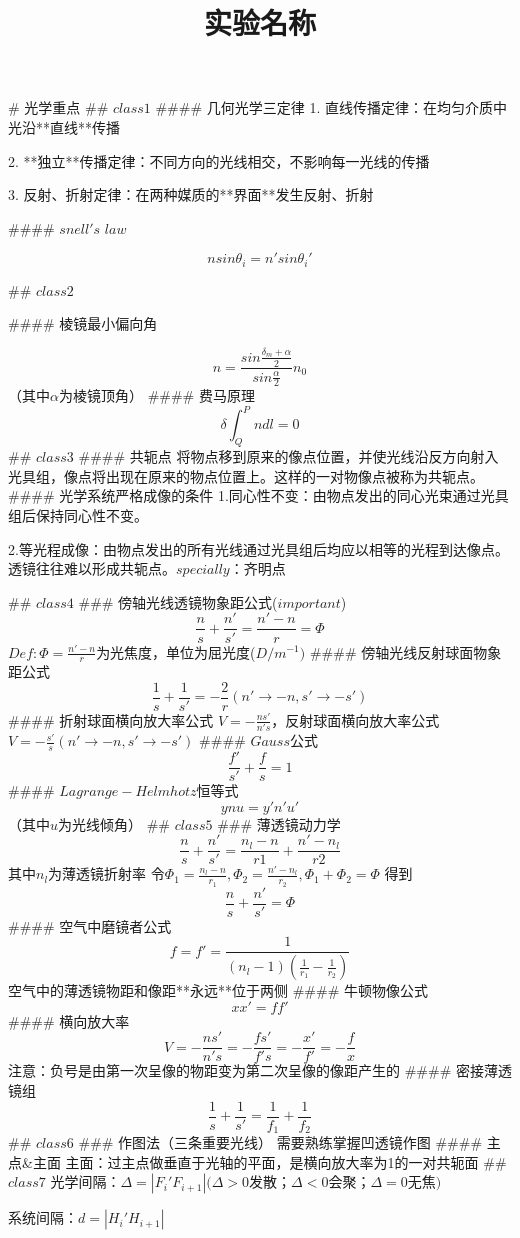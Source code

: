 \documentclass[12pt]{ctexart}
\title{实验名称}
\begin{document}
# 光学重点
## $class1$
#### 几何光学三定律
1. 直线传播定律：在均匀介质中光沿**直线**传播

2. **独立**传播定律：不同方向的光线相交，不影响每一光线的传播

3. 反射、折射定律：在两种媒质的**界面**发生反射、折射

#### $snell's$ $law$

$$nsin\theta_{i}=n'sin\theta_{i}'$$

## $class2$

#### 棱镜最小偏向角

$$n=\frac{sin\frac{\delta_{m}+\alpha}{2}}{sin\frac{\alpha}{2}}n_{0}$$
（其中$\alpha$为棱镜顶角）
#### 费马原理
$$\delta\int_Q^Pndl=0$$
## $class3$
#### 共轭点
将物点移到原来的像点位置，并使光线沿反方向射入光具组，像点将出现在原来的物点位置上。这样的一对物像点被称为共轭点。
#### 光学系统严格成像的条件
1.同心性不变：由物点发出的同心光束通过光具组后保持同心性不变。

2.等光程成像：由物点发出的所有光线通过光具组后均应以相等的光程到达像点。
透镜往往难以形成共轭点。$specially$：齐明点

## $class4$
### 傍轴光线透镜物象距公式($important$)
$$\frac{n}{s}+\frac{n'}{s'}=\frac{n'-n}{r}=\Phi$$
$Def:\Phi=\frac{n'-n}{r}$为光焦度，单位为屈光度($D/m^{-1})$
#### 傍轴光线反射球面物象距公式
$$\frac{1}{s}+\frac{1}{s'}=-\frac{2}{r}(n'\rightarrow-n,s'\rightarrow-s')$$
#### 折射球面横向放大率公式
$V=-\frac{ns'}{n's}$，反射球面横向放大率公式$V=-\frac{s'}{s}(n'\rightarrow-n,s'\rightarrow-s')$
#### $Gauss$公式
$$\frac{f'}{s'}+\frac{f}{s}=1$$
#### $Lagrange-Helmhotz$恒等式
$$ynu=y'n'u'$$
（其中$u$为光线倾角）
## $class5$
### 薄透镜动力学
$$\frac{n}{s}+\frac{n'}{s'}=\frac{n_{l}-n}{r1}+\frac{n'-n_{l}}{r2}$$
其中$n_{l}$为薄透镜折射率
令$\Phi_{1}=\frac{n_{l}-n}{r_{1}},\Phi_{2}=\frac{n'-n_{l}}{r_{2}},\Phi_{1}+\Phi_{2}=\Phi$
得到
$$\frac{n}{s}+\frac{n'}{s'}=\Phi$$
#### 空气中磨镜者公式
$$f=f'=\frac{1}{(n_{l}-1)(\frac{1}{r_{1}}-\frac{1}{r_{2}})}$$
空气中的薄透镜物距和像距**永远**位于两侧
#### 牛顿物像公式
$$xx'=ff'$$
#### 横向放大率
$$V=-\frac{ns'}{n's}=-\frac{fs'}{f's}=-\frac{x'}{f'}=-\frac{f}{x}$$
注意：负号是由第一次呈像的物距变为第二次呈像的像距产生的
#### 密接薄透镜组
$$\frac{1}{s}+\frac{1}{s'}=\frac{1}{f_{1}}+\frac{1}{f_{2}}$$
## $class6$
### 作图法（三条重要光线）
需要熟练掌握凹透镜作图
#### 主点&主面
主面：过主点做垂直于光轴的平面，是横向放大率为1的一对共轭面
## $class7$
光学间隔：$\Delta=|F_i'F_{i+1}|(\Delta>0$发散；$\Delta<0$会聚；$\Delta=0$无焦$)$

系统间隔：$d=|H_i'H_{i+1}|$
\end{document}
